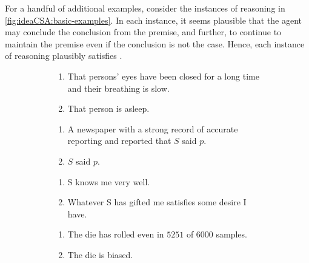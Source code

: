 \begin{note}
  For a handful of additional examples, consider the instances of reasoning in \autoref{fig:ideaCSA:basic-examples}.
  In each instance, it seems plausible that the agent may conclude the conclusion from the premise, and further, to continue to maintain the premise even if the conclusion is not the case.
  Hence, each instance of reasoning plausibly satisfies \ideaCSA{}.

  \begin{figure}[h!]
    \mbox{}\hfill
    \begin{subfigure}{0.45\linewidth}
      \begin{enumerate}
      \item That persons' eyes have been closed for a long time and their breathing is slow.
      \item That person is asleep.
      \end{enumerate}
      \caption{}
    \end{subfigure}
    \hfill
    \begin{subfigure}{0.45\linewidth}
      \begin{enumerate}
      \item A newspaper with a strong record of accurate reporting and reported that \(S\) said \(p\).
      \item \(S\) said \(p\).
      \end{enumerate}
      \caption{}
    \end{subfigure}
    \hfill\mbox{}

    \mbox{}\hfill
    \begin{subfigure}{0.45\linewidth}
      \begin{enumerate}
      \item S knows me very well.
      \item Whatever S has gifted me satisfies some desire I have.
      \end{enumerate}
      \caption{}
    \end{subfigure}
    \hfill
    \begin{subfigure}{0.45\linewidth}
      \begin{enumerate}
      \item The die has rolled even in \(5251\) of \(6000\) samples.
      \item The die is biased.
      \end{enumerate}
      \caption{}
    \end{subfigure}
    \hfill\mbox{}
    \caption{}
    \label{fig:ideaCSA:basic-examples}
  \end{figure}


\end{note}
